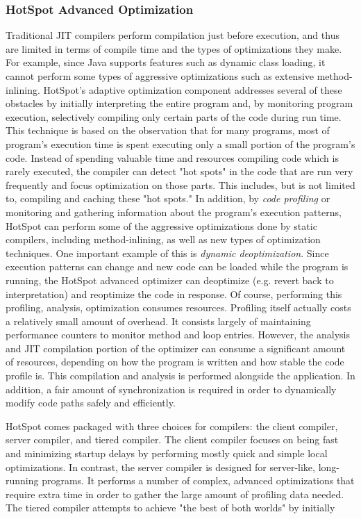 \documentclass{sig-alternate}
\begin{document}
\subsubsection{HotSpot Advanced Optimization}

Traditional JIT compilers perform compilation just before execution, and thus are limited in terms of compile time and the types of optimizations they make. For example, since Java supports features such as dynamic class loading, it cannot perform some types of aggressive optimizations such as extensive method-inlining. HotSpot's adaptive optimization component  addresses several of these obstacles by initially interpreting the entire program and, by monitoring program execution, selectively compiling only certain parts of the code during run time. This technique is based on the observation that for many programs, most of program's execution time is spent executing only a small portion of the program's code. Instead of spending valuable time and resources compiling code which is rarely executed, the compiler can detect "hot spots" in the code that are run very frequently and focus optimization on those parts. This includes, but is not limited to, compiling and caching these "hot spots." In addition, by \textit{code profiling} or monitoring and gathering information about the program's execution patterns, HotSpot can perform some of the aggressive optimizations done by static compilers, including method-inlining, as well as new types of optimization techniques. One important example of this is \textit{dynamic deoptimization}. Since execution patterns can change and new code can be loaded while the program is running, the HotSpot advanced optimizer can deoptimize (e.g. revert back to interpretation) and reoptimize the code in response.
Of course, performing this profiling, analysis, optimization consumes resources. Profiling itself actually costs a relatively small amount of overhead. It consists largely of maintaining performance counters to monitor method and loop entries. However, the analysis and JIT compilation portion of the optimizer can consume a significant amount of resources, depending on how the program is written and how stable the code profile is. This compilation and analysis is performed alongside the application. In addition, a fair amount of synchronization is required in order to dynamically modify code paths safely and efficiently.

HotSpot comes packaged with three choices for compilers: the client compiler, server compiler, and tiered compiler. The client compiler focuses on being fast and minimizing startup delays by performing mostly quick and simple local optimizations. In contrast, the server compiler is designed for server-like, long-running programs. It performs a number of complex, advanced optimizations that require extra time in order to gather the large amount of profiling data needed. The tiered compiler attempts to achieve "the best of both worlds" by initially 
\end{document}

